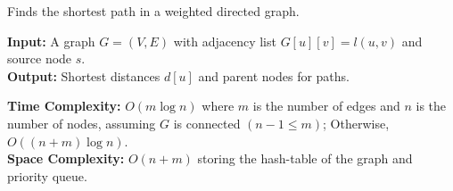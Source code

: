 \newpage
\begin{Func}

    Finds the shortest path in a weighted directed graph.

    \vspace{.5em}
    \noindent
    \textbf{Input:} A graph $G = (V, E)$ with adjacency list $G[u][v] = l(u, v)$ and source node $s$.\\
    \textbf{Output:} Shortest distances $d[u]$ and parent nodes for paths.

    \begin{algorithm}[H]
        \SetAlgoLined
    \end{algorithm}

    \noindent
    \textbf{Time Complexity:} $O(m\log n)$ where $m$ is the number of edges and $n$ is the number of nodes, assuming $G$ is connected $(n-1\leq m)$; Otherwise,
    $O((n+m)\log n)$.\\
    \textbf{Space Complexity:} $O(n+m)$ storing the hash-table of the graph and priority queue.
\end{Func}
